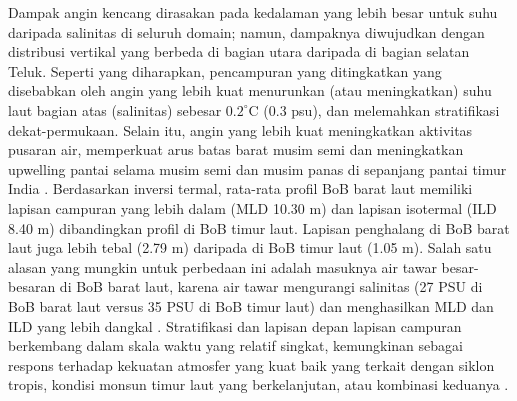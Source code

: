 \begin{spacing}{1.5}
	Dampak angin kencang dirasakan pada kedalaman yang lebih besar untuk suhu daripada salinitas di seluruh domain; namun, dampaknya diwujudkan dengan distribusi vertikal yang berbeda di bagian utara daripada di bagian selatan Teluk. Seperti yang diharapkan, pencampuran yang ditingkatkan yang disebabkan oleh angin yang lebih kuat menurunkan (atau meningkatkan) suhu laut bagian atas (salinitas) sebesar $0.2^\circ$C (0.3 psu), dan melemahkan stratifikasi dekat-permukaan. Selain itu, angin yang lebih kuat meningkatkan aktivitas pusaran air, memperkuat arus batas barat musim semi dan meningkatkan upwelling pantai selama musim semi dan musim panas di sepanjang pantai timur India . Berdasarkan inversi termal, rata-rata profil BoB barat laut memiliki lapisan campuran yang lebih dalam (MLD 10.30 m) dan lapisan isotermal (ILD 8.40 m) dibandingkan profil di BoB timur laut. Lapisan penghalang di BoB barat laut juga lebih tebal (2.79 m) daripada di BoB timur laut (1.05 m). Salah satu alasan yang mungkin untuk perbedaan ini adalah masuknya air tawar besar-besaran di BoB barat laut, karena air tawar mengurangi salinitas (27 PSU di BoB barat laut versus 35 PSU di BoB timur laut) dan menghasilkan MLD dan ILD yang lebih dangkal .  Stratifikasi dan lapisan depan lapisan campuran berkembang dalam skala waktu yang relatif singkat, kemungkinan sebagai respons terhadap kekuatan atmosfer yang kuat baik yang terkait dengan siklon tropis, kondisi monsun timur laut yang berkelanjutan, atau kombinasi keduanya . 
		

\end{spacing}
